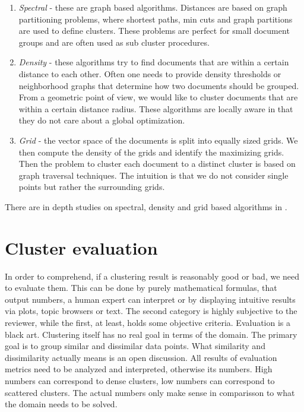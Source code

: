       \begin{enumerate}
        \item \emph{Spectral} - these are graph based algorithms. Distances are based on graph partitioning problems, where shortest paths, min cuts and graph partitions are used to define clusters. These problems are perfect for small document groups and are often used as sub cluster procedures.
        \item \emph{Density} - these algorithms try to find documents that are within a certain distance to each other. Often one needs to provide density thresholds or neighborhood graphs that determine how two documents should be grouped. From a geometric point of view, we would like to cluster documents that are within a certain distance radius. These algorithms are locally aware in that they do not care about a global optimization.
        \item \emph{Grid} - the vector space of the documents is split into equally sized grids. We then compute the density of the grids and identify the maximizing grids. Then the problem to cluster each document to a distinct cluster is based on graph traversal techniques. The intuition is that we do not consider single points but rather the surrounding grids.
      \end{enumerate}

    There are in depth studies on spectral, density and grid based algorithms in \cite{ClusteringBooAggarwalk2013}.


\section{Cluster evaluation}
\label{sec:evaluation}

  In order to comprehend, if a clustering result is reasonably good or bad, we need to evaluate them. This can be done by purely mathematical formulas, that output numbers, a human expert can interpret or by displaying intuitive results via plots, topic browsers or text. The second category is highly subjective to the reviewer, while the first, at least, holds some objective criteria. Evaluation is a black art. Clustering itself has no real goal in terms of the domain. The primary goal is to group similar and dissimilar data points. What similarity and dissimilarity actually means is an open discussion. All results of evaluation metrics need to be analyzed and interpreted, otherwise its numbers. High numbers can correspond to dense clusters, low numbers can correspond to scattered clusters. The actual numbers only make sense in comparisson to what the domain needs to be solved.\\

